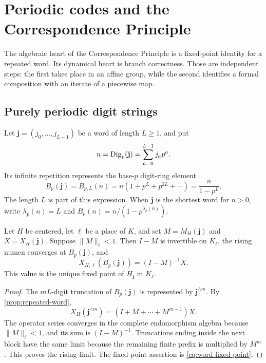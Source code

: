\section{Periodic codes and the Correspondence Principle}
\label{sec:correspondence}

The algebraic heart of the Correspondence Principle is a fixed-point
identity for a repeated word.  Its dynamical heart is branch correctness.
Those are independent steps: the first takes place in an affine group, while
the second identifies a formal composition with an iterate of a piecewise
map.

\subsection{Purely periodic digit strings}

Let $\mathbf j=(j_0,\ldots,j_{L-1})$ be a word of length $L\geq1$, and put
\[
 n=\operatorname{Dig}_p(\mathbf j)=\sum_{a=0}^{L-1}j_ap^a.
\]
Its infinite repetition represents the base-$p$ digit-ring element
\begin{equation}
\label{eq:Bp}
 B_p(\mathbf j)=B_{p,L}(n)
 =n(1+p^L+p^{2L}+\cdots)=\frac{n}{1-p^L}.
\end{equation}
The length $L$ is part of this expression.  When $\mathbf j$ is the shortest
word for $n>0$, write $\lambda_p(n)=L$ and
$B_p(n)=n/(1-p^{\lambda_p(n)})$.

\begin{theorem}
\label{thm:repeated-code-fixed-point}
Let $H$ be centered, let $\ell$ be a place of $K$, and set
$M=M_H(\mathbf j)$ and $X=X_H(\mathbf j)$.  Suppose
$\|M\|_\ell<1$.  Then $I-M$ is invertible on $K_\ell$, the rising numen
converges at $B_p(\mathbf j)$, and
\begin{equation}
\label{eq:repeated-code-value}
 X_{H,\ell}(B_p(\mathbf j))=(I-M)^{-1}X.
\end{equation}
This value is the unique fixed point of $H_{\mathbf j}$ in $K_\ell$.
\end{theorem}

\begin{proof}
The $mL$-digit truncation of $B_p(\mathbf j)$ is represented by
$\mathbf j^{\wedge m}$.  By \cref{prop:repeated-word},
\[
 X_H(\mathbf j^{\wedge m})
 =(I+M+\cdots+M^{m-1})X.
\]
The operator series converges in the complete endomorphism algebra because
$\|M\|_\ell<1$, and its sum is $(I-M)^{-1}$.  Truncations ending inside the
next block have the same limit because the remaining finite prefix is
multiplied by $M^m$.  This proves the rising limit.  The fixed-point assertion
is \cref{eq:word-fixed-point}.
\end{proof}

